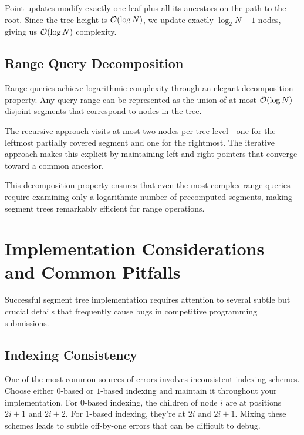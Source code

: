 Point updates modify exactly one leaf plus all its ancestors on the path to the root. Since the tree height is $\mathcal{O}(\log N)$, we update exactly $\log_2 N + 1$ nodes, giving us $\mathcal{O}(\log N)$ complexity.

\subsection{Range Query Decomposition}

Range queries achieve logarithmic complexity through an elegant decomposition property. Any query range can be represented as the union of at most $\mathcal{O}(\log N)$ disjoint segments that correspond to nodes in the tree.


The recursive approach visits at most two nodes per tree level—one for the leftmost partially covered segment and one for the rightmost. The iterative approach makes this explicit by maintaining left and right pointers that converge toward a common ancestor.

This decomposition property ensures that even the most complex range queries require examining only a logarithmic number of precomputed segments, making segment trees remarkably efficient for range operations.

\section{Implementation Considerations and Common Pitfalls}
\label{sec:indexing_mid_calc_pitfalls}

Successful segment tree implementation requires attention to several subtle but crucial details that frequently cause bugs in competitive programming submissions.

\subsection{Indexing Consistency}

One of the most common sources of errors involves inconsistent indexing schemes. Choose either $0$-based or $1$-based indexing and maintain it throughout your implementation. For $0$-based indexing, the children of node $i$ are at positions $2i+1$ and $2i+2$. For $1$-based indexing, they're at $2i$ and $2i+1$. Mixing these schemes leads to subtle off-by-one errors that can be difficult to debug.

